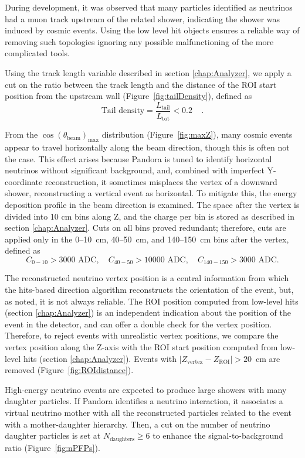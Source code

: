 During development, it was observed that many particles identified as neutrinos had a muon track upstream of the related shower, indicating the shower was induced by cosmic events. Using the low level hit objects ensures a reliable way of removing such topologies ignoring any possible malfunctioning of the more complicated tools.

Using the track length variable described in section \ref{chap:Analyzer}, we apply a cut on the ratio between the track length and the distance of the ROI start position from the upstream wall (Figure~\ref{fig:tailDensity}), defined as $$\text{Tail density} = \frac{L_{\text{tail}}}{L_{\text{tot}}} < 0.2~~~~~.$$ 

From the $\cos(\theta_{\mathrm{beam}})_{\text{max}}$ distribution (Figure~\ref{fig:maxZ}), many cosmic events appear to travel horizontally along the beam direction, though this is often not the case. This effect arises because Pandora is tuned to identify horizontal neutrinos without significant background, and, combined with imperfect Y-coordinate reconstruction, it sometimes misplaces the vertex of a downward shower, reconstructing a vertical event as horizontal. 
To mitigate this, the energy deposition profile in the beam direction is examined. The space after the vertex is divided into 10 cm bins along Z, and the charge per bin is stored as described in section \ref{chap:Analyzer}.
Cuts on all bins proved redundant; therefore, cuts are applied only in the 0–10~cm, 40–50~cm, and 140–150~cm bins after the vertex, defined as 
$$
C_{0-10}>3000 \text{~ADC}, \quad C_{40-50}>10000\text{~ADC}, \quad C_{140-150}>3000\text{~ADC}.
$$


The reconstructed neutrino vertex position is a central information from which the hits-based direction algorithm reconstructs the orientation of the event, but, as noted, it is not always reliable. 
The ROI position computed from low-level hits (section \ref{chap:Analyzer}) is an independent indication about the position of the event in the detector, and can offer a double check for the vertex position. Therefore, to reject events with unrealistic vertex positions, we compare the vertex position along the Z-axis with the ROI start position computed from low-level hits (section \ref{chap:Analyzer}).
Events with $\lvert Z_{\text{vertex}} - Z_{\text{ROI}} \rvert > 20$~cm are removed (Figure~\ref{fig:ROIdistance}).

High-energy neutrino events are expected to produce large showers with many daughter particles. If Pandora identifies a neutrino interaction, it associates a virtual neutrino mother with all the reconstructed particles related to the event with a mother-daughter hierarchy. Then, a cut on the number of neutrino daughter particles is set at $N_{\text{daughters}} \geq 6$ to enhance the signal-to-background ratio (Figure~\ref{fig:nPFPs}). 

